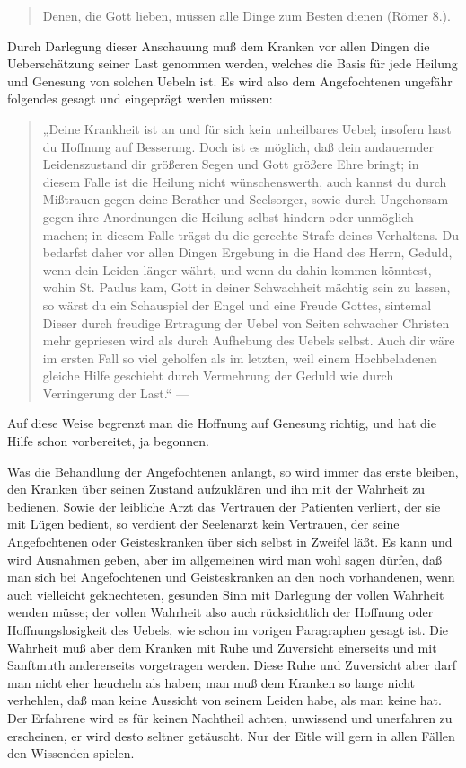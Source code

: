 \begin{quote}
Denen, die Gott lieben, müssen alle Dinge zum Besten dienen (Römer 8.).
\end{quote}

Durch Darlegung dieser Anschauung muß dem Kranken vor allen Dingen die Ueberschätzung seiner Last genommen werden, welches die Basis für jede Heilung und Genesung von solchen Uebeln ist. Es wird also dem Angefochtenen ungefähr folgendes gesagt und eingeprägt werden müssen:

\begin{quote}
„Deine Krankheit ist an und für sich kein unheilbares Uebel; insofern hast du Hoffnung auf Besserung. Doch ist es möglich, daß dein andauernder Leidenszustand dir größeren Segen und Gott größere Ehre bringt; in diesem Falle ist die Heilung nicht wünschenswerth, auch kannst du durch Mißtrauen gegen deine Berather und Seelsorger, sowie durch Ungehorsam gegen ihre Anordnungen die Heilung selbst hindern oder unmöglich machen; in diesem Falle trägst du die gerechte Strafe deines Verhaltens. Du bedarfst daher vor allen Dingen Ergebung in die Hand des Herrn, Geduld, wenn dein Leiden länger währt, und wenn du dahin kommen könntest, wohin St. Paulus kam, Gott in deiner Schwachheit mächtig sein zu lassen, so wärst du ein Schauspiel der Engel und eine Freude Gottes, sintemal Dieser durch freudige Ertragung der Uebel von Seiten schwacher Christen mehr gepriesen wird als durch Aufhebung des Uebels selbst. Auch dir wäre im ersten Fall so viel
geholfen als im letzten, weil einem Hochbeladenen gleiche Hilfe geschieht durch Vermehrung der Geduld wie durch Verringerung der Last.“ —
\end{quote}

Auf diese Weise begrenzt man die Hoffnung auf Genesung richtig, und hat die Hilfe schon vorbereitet, ja begonnen.

Was die Behandlung der Angefochtenen anlangt, so wird immer das erste bleiben, den Kranken über seinen Zustand aufzuklären und ihn mit der Wahrheit zu bedienen. Sowie der leibliche Arzt das Vertrauen der Patienten verliert, der sie mit Lügen bedient, so verdient der Seelenarzt kein Vertrauen, der seine Angefochtenen oder Geisteskranken über sich selbst in Zweifel läßt. Es kann und wird Ausnahmen geben, aber im allgemeinen wird man wohl sagen dürfen, daß man sich bei Angefochtenen und Geisteskranken an den noch vorhandenen, wenn auch vielleicht geknechteten, gesunden Sinn mit Darlegung der vollen Wahrheit wenden müsse; der vollen Wahrheit also auch rücksichtlich der Hoffnung oder Hoffnungslosigkeit des Uebels, wie schon im vorigen Paragraphen gesagt ist. Die Wahrheit muß aber dem Kranken mit Ruhe und Zuversicht einerseits und mit Sanftmuth andererseits vorgetragen werden. Diese Ruhe und Zuversicht aber darf man nicht eher heucheln als haben; man muß dem Kranken so lange nicht verhehlen, daß man keine Aussicht von seinem Leiden habe, als man keine hat. Der Erfahrene wird es für keinen Nachtheil achten, unwissend und unerfahren zu erscheinen, er wird desto seltner getäuscht. Nur der Eitle will gern in allen Fällen den Wissenden spielen.

